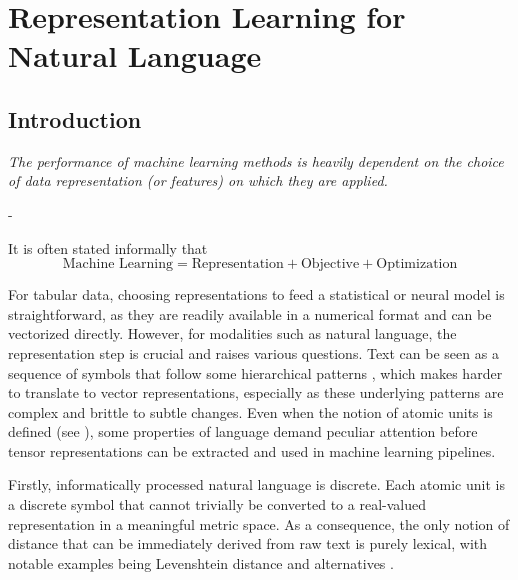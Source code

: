 \section{Representation Learning for Natural Language}

\subsection{Introduction}

\begin{center}
  \begin{minipage}{0.7\textwidth}
    \textit{The performance of machine learning methods is heavily
dependent on the choice of data representation (or
features) on which they are applied.} 
\begin{flushright}- \citet{bengio_repr} \end{flushright}
  \end{minipage}
\end{center}

It is often stated informally that 
$$
\text{Machine Learning} = \text{Representation} + \text{Objective} + \text{Optimization}
$$

For tabular data, choosing representations to feed a statistical or neural model is straightforward, as they are readily available in a numerical format and can be vectorized directly. However, for modalities such as natural language, the representation step is crucial and raises various questions. Text can be seen as a sequence of symbols that follow some hierarchical patterns \citep{longacre}, which makes harder to translate to vector representations, especially as these underlying patterns are complex and brittle to subtle changes. Even when the notion of atomic units is defined (see ), some properties of language demand peculiar attention before tensor representations can be extracted and used in machine learning pipelines.

Firstly, informatically processed natural language is discrete. Each atomic unit is a discrete symbol that cannot trivially be converted to a real-valued representation in a meaningful metric space. As a consequence, the only notion of distance that can be immediately derived from raw text is purely lexical, with notable examples being Levenshtein distance \citep{levenshtein1966binary} and alternatives \citep{hamming, jaro}.

